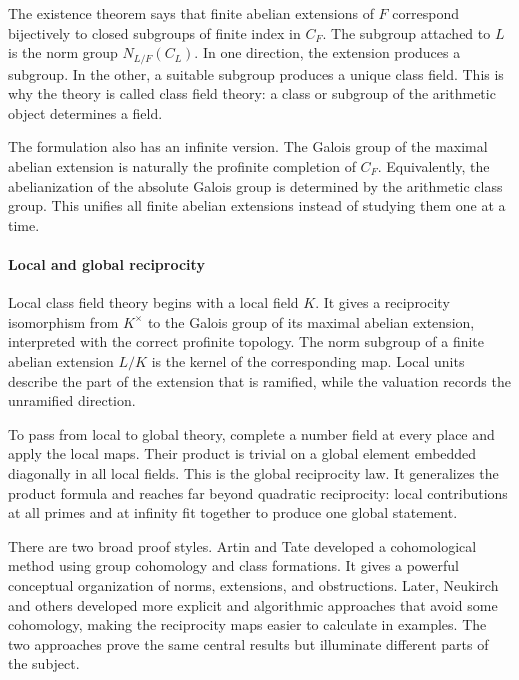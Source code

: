 The existence theorem says that finite abelian extensions of $F$ correspond bijectively to closed subgroups of finite index in $C_F$. The subgroup attached to $L$ is the norm group $N_{L/F}(C_L)$. In one direction, the extension produces a subgroup. In the other, a suitable subgroup produces a unique class field. This is why the theory is called class field theory: a class or subgroup of the arithmetic object determines a field.

The formulation also has an infinite version. The Galois group of the maximal abelian extension is naturally the profinite completion of $C_F$. Equivalently, the abelianization of the absolute Galois group is determined by the arithmetic class group. This unifies all finite abelian extensions instead of studying them one at a time. \cite{class_field_theory_ref1,class_field_theory_ref5}

\paragraph{Local and global reciprocity}

Local class field theory begins with a local field $K$. It gives a reciprocity isomorphism from $K^\times$ to the Galois group of its maximal abelian extension, interpreted with the correct profinite topology. The norm subgroup of a finite abelian extension $L/K$ is the kernel of the corresponding map. Local units describe the part of the extension that is ramified, while the valuation records the unramified direction.

To pass from local to global theory, complete a number field at every place and apply the local maps. Their product is trivial on a global element embedded diagonally in all local fields. This is the global reciprocity law. It generalizes the product formula and reaches far beyond quadratic reciprocity: local contributions at all primes and at infinity fit together to produce one global statement. \cite{class_field_theory_ref1,class_field_theory_ref3}

There are two broad proof styles. Artin and Tate developed a cohomological method using group cohomology and class formations. It gives a powerful conceptual organization of norms, extensions, and obstructions. Later, Neukirch and others developed more explicit and algorithmic approaches that avoid some cohomology, making the reciprocity maps easier to calculate in examples. The two approaches prove the same central results but illuminate different parts of the subject. \cite{class_field_theory_ref3,class_field_theory_ref6}

